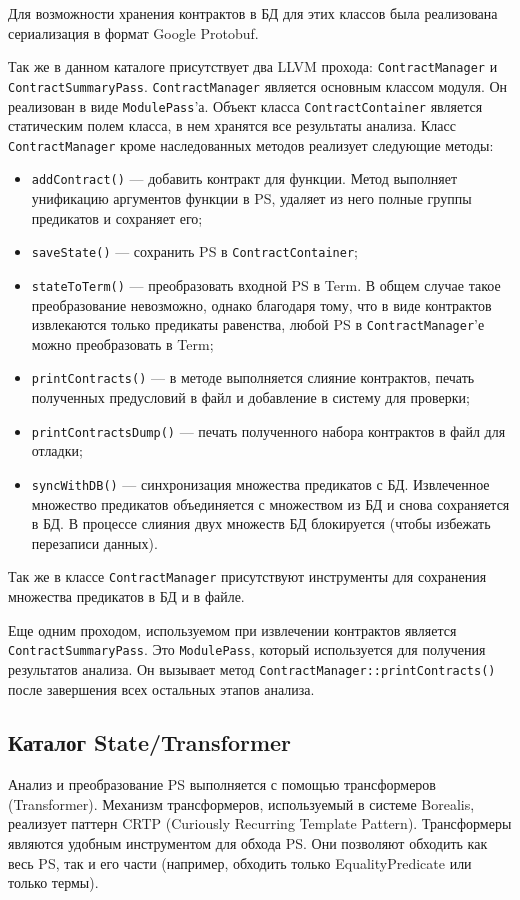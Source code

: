 Для возможности хранения контрактов в БД для этих классов была реализована сериализация в формат Google Protobuf\cite{protobuf}. 

Так же в данном каталоге присутствует два LLVM прохода: \texttt{ContractManager} и \texttt{ContractSummaryPass}. \texttt{ContractManager} является основным классом модуля. Он реализован в виде \texttt{ModulePass}'а. Объект класса \texttt{ContractContainer} является статическим полем класса, в нем хранятся все результаты анализа. Класс \texttt{ContractManager} кроме наследованных методов реализует следующие методы:
\begin{itemize}
\item \texttt{addContract()} --- добавить контракт для функции. Метод выполняет унификацию аргументов функции в PS, удаляет из него полные группы предикатов и сохраняет его;
\item \texttt{saveState()} --- сохранить PS в \texttt{ContractContainer};
\item \texttt{stateToTerm()} --- преобразовать входной PS в Term. В общем случае такое преобразование невозможно, однако благодаря тому, что в виде контрактов извлекаются только предикаты равенства, любой PS в \texttt{ContractManager}'е можно преобразовать в Term;
\item \texttt{printContracts()} --- в методе выполняется слияние контрактов, печать полученных предусловий в файл и добавление в систему для проверки;
\item \texttt{printContractsDump()} --- печать полученного набора контрактов в файл для отладки;
\item \texttt{syncWithDB()} --- синхронизация множества предикатов с БД. Извлеченное множество предикатов объединяется с множеством из БД и снова сохраняется в БД. В процессе слияния двух множеств БД блокируется (чтобы избежать перезаписи данных).
\end{itemize}

Так же в классе \texttt{ContractManager} присутствуют инструменты для сохранения множества предикатов в БД и в файле.

Еще одним проходом, используемом при извлечении контрактов является \texttt{ContractSummaryPass}. Это \texttt{ModulePass}, который используется для получения результатов анализа. Он вызывает метод \texttt{ContractManager::printContracts()} после завершения всех остальных этапов анализа.

\subsection{Каталог State/Transformer}
Анализ и преобразование PS выполняется с помощью трансформеров (Transformer). Механизм трансформеров, используемый в системе Borealis, реализует паттерн CRTP (Curiously Recurring Template Pattern)\cite{crtp}. Трансформеры являются удобным инструментом для обхода PS. Они позволяют обходить как весь PS, так и его части (например, обходить только EqualityPredicate или только термы).

